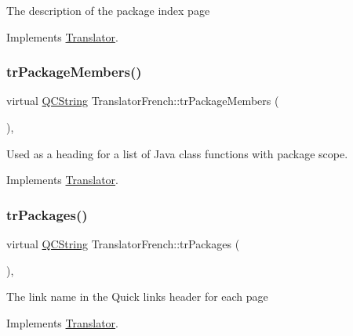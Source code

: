 The description of the package index page 

Implements \mbox{\hyperlink{class_translator}{Translator}}.

\mbox{\label{class_translator_french_a517e821a17cf38938bbc619ce9e7aa71}} 
\subsubsection{\texorpdfstring{trPackageMembers()}{trPackageMembers()}}
{\footnotesize\ttfamily virtual \mbox{\hyperlink{class_q_c_string}{Q\+C\+String}} Translator\+French\+::tr\+Package\+Members (\begin{DoxyParamCaption}{ }\end{DoxyParamCaption})\hspace{0.3cm}{\ttfamily [inline]}, {\ttfamily [virtual]}}

Used as a heading for a list of Java class functions with package scope. 

Implements \mbox{\hyperlink{class_translator}{Translator}}.

\mbox{\label{class_translator_french_adebadcb28ad354a535908e7a087e4eb5}} 
\subsubsection{\texorpdfstring{trPackages()}{trPackages()}}
{\footnotesize\ttfamily virtual \mbox{\hyperlink{class_q_c_string}{Q\+C\+String}} Translator\+French\+::tr\+Packages (\begin{DoxyParamCaption}{ }\end{DoxyParamCaption})\hspace{0.3cm}{\ttfamily [inline]}, {\ttfamily [virtual]}}

The link name in the Quick links header for each page 

Implements \mbox{\hyperlink{class_translator}{Translator}}.

\mbox{\label{class_translator_french_a2c53fd1672f6c10d83b3f8ee5de75f16}} 
